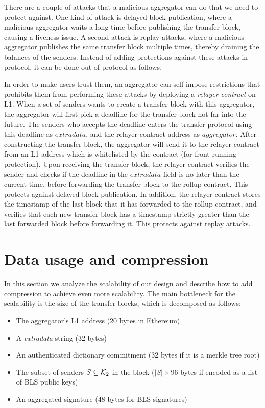 There are a couple of attacks that a malicious aggregator can do that we need to protect against. One kind of attack is delayed block publication, where a malicious aggregator waits a long time before publishing the transfer block, causing a liveness issue. A second attack is replay attacks, where a malicious aggregator publishes the same transfer block multiple times, thereby draining the balances of the senders. Instead of adding protections against these attacks in-protocol, it can be done out-of-protocol as follows.

In order to make users trust them, an aggregator can self-impose restrictions that prohibits them from performing these attacks by deploying a \emph{relayer contract} on L1. When a set of senders wants to create a transfer block with this aggregator, the aggregator will first pick a deadline for the transfer block not far into the future. The senders who accepts the deadline enters the transfer protocol using this deadline as \(extradata\), and the relayer contract address as \(aggregator\). After constructing the transfer block, the aggregator will send it to the relayer contract from an L1 address which is whitelisted by the contract (for front-running protection). Upon receiving the transfer block, the relayer contract verifies the sender and checks if the deadline in the \(extradata\) field is no later than the current time, before forwarding the transfer block to the rollup contract. This protects against delayed block publication. In addition, the relayer contract stores the timestamp of the last block that it has forwarded to the rollup contract, and verifies that each new transfer block has a timestamp strictly greater than the last forwarded block before forwarding it. This protects against replay attacks.

\section{Data usage and compression}

In this section we analyze the scalability of our design and describe how to add compression to achieve even more scalability. The main bottleneck for the scalability is the size of the transfer blocks, which is decomposed as follows:

\begin{itemize}
	\item The aggregator's L1 address (20 bytes in Ethereum)
	\item A \emph{extradata} string (32 bytes)
	\item An authenticated dictionary commitment (32 bytes if it is a merkle tree root)
	\item The subset of senders \(S \subseteq \mathcal{K}_2\) in the block (\(|S| \times 96\) bytes if encoded as a list of BLS public keys)
	\item An aggregated signature (48 bytes for BLS signatures)
\end{itemize}

